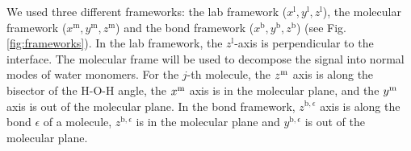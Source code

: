 We used three different frameworks: the lab framework ($x^{\text{l}},y^{\text{l}},z^{\text{l}}$), the molecular framework
($x^{\text{m}},y^{\text{m}},z^{\text{m}}$) and the bond framework ($x^{\text{b}},y^{\text{b}},z^{\text{b}}$) (see Fig.\space\ref{fig:frameworks}).
In the lab framework, the $z^{\text{l}}$-axis is perpendicular to the interface.
The molecular frame will be used to decompose the signal into normal modes of water monomers.
For the $j$-th molecule, the $z^{\text m}$ axis is along the bisector of the H-O-H angle, the $x^{\text m}$ axis is in the molecular plane,
and the $y^{\text m}$ axis is out of the molecular plane. 
In the bond framework, $z^{\text{b},\epsilon}$ axis is along the bond $\epsilon$ of a molecule, $z^{\text{b},\epsilon}$
is in the molecular plane and $y^{\text{b},\epsilon}$ is out of the molecular plane.

